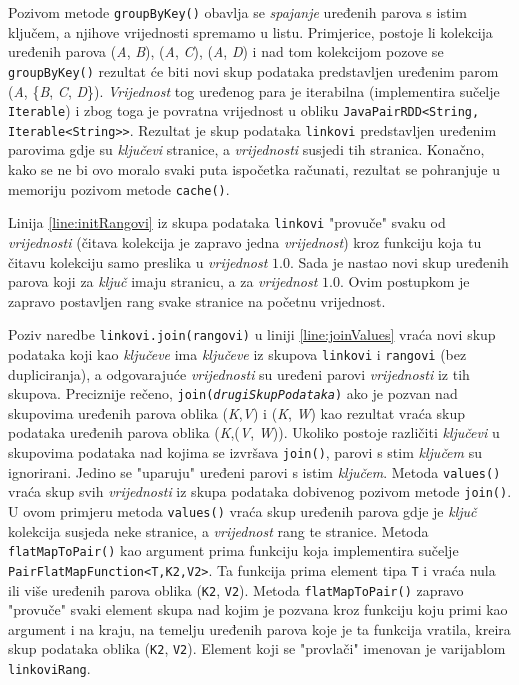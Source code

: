 \documentclass[times, utf8, zavrsni, numeric]{fer}
\begin{document}
Pozivom metode \texttt{groupByKey()} obavlja se \emph{spajanje} uređenih parova s istim ključem, a njihove vrijednosti spremamo u listu. Primjerice, postoje li kolekcija uređenih parova (\emph{A}, \emph{B}), (\emph{A}, \emph{C}), (\emph{A}, \emph{D}) i nad tom kolekcijom pozove se \texttt{groupByKey()} rezultat će biti novi skup podataka predstavljen uređenim parom (\emph{A}, \{\emph{B}, \emph{C}, \emph{D}\}). \emph{Vrijednost} tog uređenog para je iterabilna (implementira sučelje \texttt{Iterable}) i zbog toga je povratna vrijednost u obliku \texttt{JavaPairRDD<String, Iterable<String>{}>}. Rezultat je skup podataka \texttt{linkovi} predstavljen uređenim parovima gdje su \emph{ključevi} stranice, a \emph{vrijednosti} susjedi tih stranica. Konačno, kako se ne bi ovo moralo svaki puta ispočetka računati, rezultat se pohranjuje u memoriju pozivom metode \texttt{cache()}.

Linija \ref{line:initRangovi} iz skupa podataka \texttt{linkovi} "provuče" svaku od \emph{vrijednosti} (čitava kolekcija je zapravo jedna \emph{vrijednost}) kroz funkciju koja tu čitavu kolekciju samo preslika u \emph{vrijednost} $1.0$. Sada je nastao novi skup uređenih parova koji za \emph{ključ} imaju stranicu, a za \emph{vrijednost} $1.0$. Ovim postupkom je zapravo postavljen rang svake stranice na početnu vrijednost.

Poziv naredbe \texttt{linkovi.join(rangovi)} u liniji \ref{line:joinValues} vraća novi skup podataka koji kao \emph{ključeve} ima \emph{ključeve} iz skupova \texttt{linkovi} i \texttt{rangovi} (bez dupliciranja), a odgovarajuće \emph{vrijednosti} su uređeni parovi \emph{vrijednosti} iz tih skupova. Preciznije rečeno, \texttt{join(\emph{drugiSkupPodataka})} ako je pozvan nad skupovima uređenih parova oblika (\emph{K},\emph{V}) i (\emph{K}, \emph{W}) kao rezultat vraća skup podataka uređenih parova oblika (\emph{K},(\emph{V}, \emph{W})). Ukoliko postoje različiti \emph{ključevi} u skupovima podataka nad kojima se izvršava \texttt{join()}, parovi s stim \emph{ključem} su ignorirani. Jedino se "uparuju" uređeni parovi s istim \emph{ključem}. Metoda \texttt{values()} vraća skup svih \emph{vrijednosti} iz skupa podataka dobivenog pozivom metode \texttt{join()}. U ovom primjeru metoda \texttt{values()} vraća skup uređenih parova gdje je \emph{ključ} kolekcija susjeda neke stranice, a \emph{vrijednost} rang te stranice. Metoda \texttt{flatMapToPair()} kao argument prima funkciju koja implementira sučelje \texttt{PairFlatMapFunction<T,K2,V2>}. Ta funkcija prima element tipa \texttt{T} i vraća nula ili više uređenih parova oblika (\texttt{K2}, \texttt{V2}). Metoda \texttt{flatMapToPair()} zapravo "provuče" svaki element skupa nad kojim je pozvana kroz funkciju koju primi kao argument i na kraju, na temelju uređenih parova koje je ta funkcija vratila, kreira skup podataka oblika (\texttt{K2}, \texttt{V2}). Element koji se "provlači" imenovan je varijablom \texttt{linkoviRang}.
\end{document}
